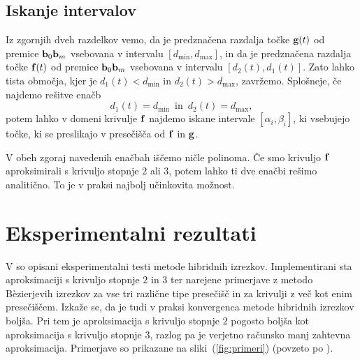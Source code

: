\documentclass[12pt,a4paper, reqno]{amsart}
\let\oldref\ref
\renewcommand{\ref}[1]{(\oldref{#1})}
\begin{document}


\subsection{Iskanje intervalov}
Iz zgornjih dveh razdelkov vemo, da je predznačena razdalja točke ${\bf g}(t)$ od premice ${\bf b}_0{\bf b}_m$ vsebovana v intervalu $[d_{\text{min}}, d_{\text{max}}]$, in da je predznačena razdalja točke ${\bf f}(t)$ od premice ${\bf b}_0{\bf b}_m$ vsebovana v intervalu $[d_2(t), d_1(t)]$. Zato lahko tista območja, kjer je $d_1(t) < d_{\text{min}}$ in $d_2(t) > d_{\text{max}}$, zavržemo. Splošneje, če najdemo rešitve enačb
$$
d_1(t) = d_{\text{min}} \, \text{ in } \, d_2(t) = d_{\text{max}},
$$
potem lahko v domeni krivulje ${\bf f}$ najdemo iskane intervale $[\alpha _i, \beta _i]$, ki vsebujejo točke, ki se preslikajo v presečišča od ${\bf f}$ in ${\bf g}$.

V obeh zgoraj navedenih enačbah iščemo ničle polinoma. Če smo krivuljo ${\bf f}$ aproksimirali s krivuljo stopnje $2$ ali $3$, potem lahko ti dve enačbi rešimo analitično. To je v praksi najbolj učinkovita možnost.




\section{Eksperimentalni rezultati}
V \cite{hyb_clip} so opisani eksperimentalni testi metode hibridnih izrezkov. Implementirani sta aproksimaciji s krivuljo stopnje $2$ in $3$ ter narejene primerjave z metodo B\`{e}zierjevih izrezkov za vse tri različne tipe presečišč in za krivulji z več kot enim presečiščem. Izkaže se, da je tudi v praksi konvergenca metode hibridnih izrezkov boljša. Pri tem je aproksimacija s krivuljo stopnje $2$ pogosto boljša kot aproksimacija s krivuljo stopnje $3$, razlog pa je verjetno računsko manj zahtevna aproksimacija. Primerjave so prikazane na sliki~\ref{fig:primeri} (povzeto po \cite{hyb_clip}).
\end{document}
